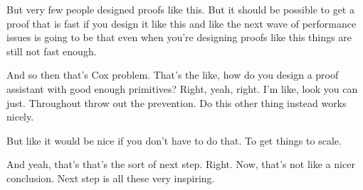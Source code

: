 \begin{subappendices}
But very few people designed proofs like this. But it should be possible to get a proof that is fast if you design it like this and like the next wave of performance issues is going to be that even when you're designing proofs like this things are still not fast enough.

And so then that's Cox problem. That's the like, how do you design a proof assistant with good enough primitives? Right, yeah, right. I'm like, look you can just. Throughout throw out the prevention. Do this other thing instead works nicely.

But like it would be nice if you don't have to do that. To get things to scale.

And yeah, that's that's the sort of next step. Right. Now, that's not like a nicer conclusion. Next step is all these very inspiring.

\end{subappendices}
